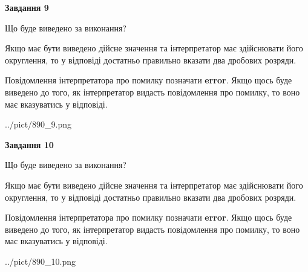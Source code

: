 \documentclass[12pt, ukrainian]{article}
\begin{document}
{\begin {Large}
{\begin {center}\textbf{Завдання 9}\end {center}}\par
Що буде виведено за виконання? \par

Якщо має бути виведено дійсне значення та інтерпретатор має здійснювати його округлення, 
то у відповіді достатньо правильно вказати два дробових розряди.

Повідомлення інтерпретатора про помилку позначати \textbf{error}.
Якщо щось буде виведено до того, як інтерпретатор видасть повідомлення про помилку, 
то воно має вказуватись у відповіді. \par

\begin{center}
	{../pict/890_9.png}
\end{center}
\newpage

{\begin {center}\textbf{Завдання 10}\end {center}}\par
Що буде виведено за виконання? \par

Якщо має бути виведено дійсне значення та інтерпретатор має здійснювати його округлення, 
то у відповіді достатньо правильно вказати два дробових розряди.

Повідомлення інтерпретатора про помилку позначати \textbf{error}.
Якщо щось буде виведено до того, як інтерпретатор видасть повідомлення про помилку, 
то воно має вказуватись у відповіді. \par

\begin{center}
	{../pict/890_10.png}
\end{center}
\newpage

\end {Large}}
\end{document}
